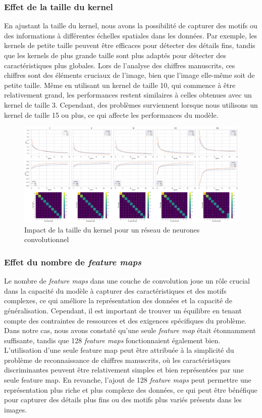 \documentclass{article}
\begin{document}
\subsubsection{Effet de la taille du kernel}

En ajustant la taille du kernel, nous avons la possibilité de capturer des motifs ou des informations à différentes échelles spatiales dans les données. Par exemple, les kernels de petite taille peuvent être efficaces pour détecter des détails fins, tandis que les kernels de plus grande taille sont plus adaptés pour détecter des caractéristiques plus globales. Lors de l'analyse des chiffres manuscrits, ces chiffres sont des éléments cruciaux de l'image, bien que l'image elle-même soit de petite taille. Même en utilisant un kernel de taille 10, qui commence à être relativement grand, les performances restent similaires à celles obtenues avec un kernel de taille 3. Cependant, des problèmes surviennent lorsque nous utilisons un kernel de taille 15 ou plus, ce qui affecte les performances du modèle.

\begin{figure}[htbp]
    \centering
    \includegraphics[width=\textwidth]{conv/conv_ksize.pdf}
    \caption{Impact de la taille du kernel pour un réseau de neurones convolutionnel}
    \label{fig:convksize}
\end{figure}

\subsubsection{Effet du nombre de \textit{feature maps}}

Le nombre de \textit{feature maps} dans une couche de convolution joue un rôle crucial dans la capacité du modèle à capturer des caractéristiques et des motifs complexes, ce qui améliore la représentation des données et la capacité de généralisation. Cependant, il est important de trouver un équilibre en tenant compte des contraintes de ressources et des exigences spécifiques du problème. Dans notre cas, nous avons constaté qu'une seule \textit{feature map} était étonnamment suffisante, tandis que 128 \textit{feature maps} fonctionnaient également bien. L'utilisation d'une seule feature map peut être attribuée à la simplicité du problème de reconnaissance de chiffres manuscrits, où les caractéristiques discriminantes peuvent être relativement simples et bien représentées par une seule feature map. En revanche, l'ajout de 128 \textit{feature maps} peut permettre une représentation plus riche et plus complexe des données, ce qui peut être bénéfique pour capturer des détails plus fins ou des motifs plus variés présents dans les images.
\end{document}
